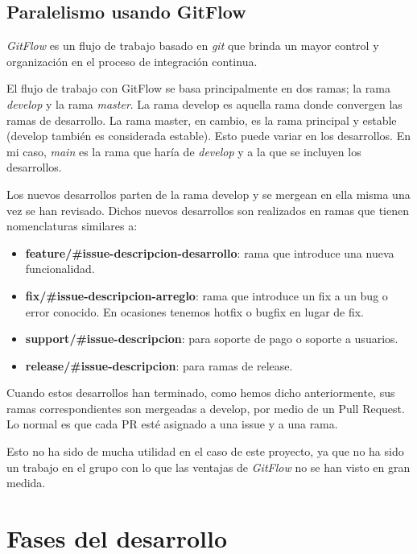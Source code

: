 \subsection{Paralelismo usando GitFlow}

\textit{GitFlow} es un flujo de trabajo basado en \textit{git} que brinda un mayor control y organización en el proceso de integración continua.\newline

El flujo de trabajo con GitFlow se basa principalmente en dos ramas; la rama \textit{develop} y la rama \textit{master}. La rama develop es aquella rama donde convergen las ramas de desarrollo. La rama master, en cambio, es la rama principal y estable (develop también es considerada estable). Esto puede variar en los desarrollos. En mi caso, \textit{main} es la rama que haría de \textit{develop} y a la que se incluyen los desarrollos.\newline

Los nuevos desarrollos parten de la rama develop y se mergean en ella misma una vez se han revisado. Dichos nuevos desarrollos son realizados en ramas que tienen nomenclaturas similares a:\newline

\begin{itemize}
	\item \textbf{feature/\#issue-descripcion-desarrollo}: rama que introduce una nueva funcionalidad.
	\item \textbf{fix/\#issue-descripcion-arreglo}: rama que introduce un fix a un bug o error conocido. En ocasiones tenemos hotfix o bugfix en lugar de fix.
	\item \textbf{support/\#issue-descripcion}: para soporte de pago o soporte a usuarios.
	\item \textbf{release/\#issue-descripcion}: para ramas de release.
\end{itemize}	

Cuando estos desarrollos han terminado, como hemos dicho anteriormente, sus ramas correspondientes son mergeadas a develop, por medio de un Pull Request. Lo normal es que cada PR esté asignado a una issue y a una rama.
\newline

Esto no ha sido de mucha utilidad en el caso de este proyecto, ya que no ha sido un trabajo en el grupo con lo que las ventajas de \textit{GitFlow} no se han visto en gran medida. \newline

\section{Fases del desarrollo} \label{fases}

